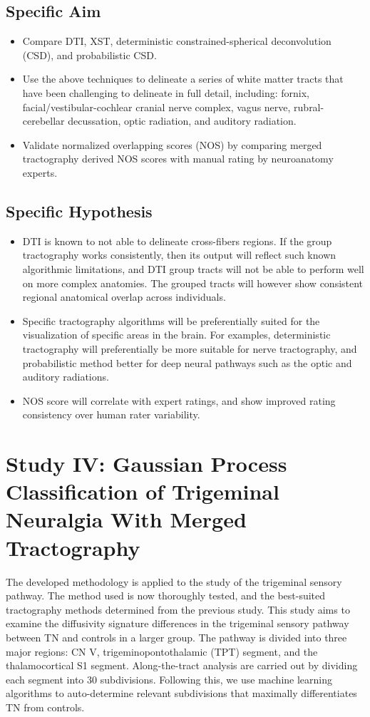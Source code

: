 \subsection{Specific Aim}
\begin{itemize}
    \item Compare DTI, XST, deterministic constrained-spherical deconvolution (CSD), and probabilistic CSD. 
    \item Use the above techniques to delineate a series of white matter tracts that have been challenging to delineate in full detail, including: fornix, facial/vestibular-cochlear cranial nerve complex, vagus nerve, rubral-cerebellar decussation, optic radiation, and auditory radiation.
    \item Validate normalized overlapping scores (NOS) by comparing merged tractography derived NOS scores with manual rating by neuroanatomy experts.
\end{itemize}

\subsection{Specific Hypothesis}
\begin{itemize}
    \item DTI is known to not able to delineate cross-fibers regions. If the group tractography works consistently, then its output will reflect such known algorithmic limitations, and DTI group tracts will not be able to perform well on more complex anatomies. The grouped tracts will however show consistent regional anatomical overlap across individuals.
    \item Specific tractography algorithms will be preferentially suited for the visualization of specific areas in the brain. For examples, deterministic tractography will preferentially be more suitable for nerve tractography, and probabilistic method better for deep neural pathways such as the optic and auditory radiations.
    \item NOS score will correlate with expert ratings, and show improved rating consistency over human rater variability.
\end{itemize}

\section{Study IV: Gaussian Process Classification of Trigeminal Neuralgia With Merged Tractography}
The developed methodology is applied to the study of the trigeminal sensory pathway. The method used is now thoroughly tested, and the best-suited tractography methods determined from the previous study. This study aims to examine the diffusivity signature differences in the trigeminal sensory pathway between TN and controls in a larger group. The pathway is divided into three major regions: CN V, trigeminopontothalamic (TPT) segment, and the thalamocortical S1 segment. Along-the-tract analysis are carried out by dividing each segment into 30 subdivisions. Following this, we use machine learning algorithms to auto-determine relevant subdivisions that maximally differentiates TN from controls.

